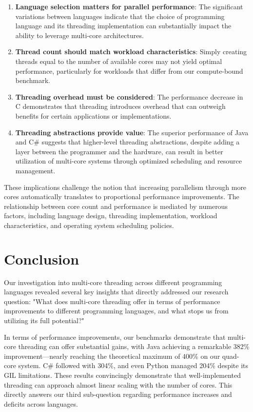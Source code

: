 \documentclass[12pt,a4paper]{article}
\begin{document}
\begin{enumerate}
    \item \textbf{Language selection matters for parallel performance}: The significant variations between languages indicate that the choice of programming language and its threading implementation can substantially impact the ability to leverage multi-core architectures.
    
    \item \textbf{Thread count should match workload characteristics}: Simply creating threads equal to the number of available cores may not yield optimal performance, particularly for workloads that differ from our compute-bound benchmark.
    
    \item \textbf{Threading overhead must be considered}: The performance decrease in C demonstrates that threading introduces overhead that can outweigh benefits for certain applications or implementations.
    
    \item \textbf{Threading abstractions provide value}: The superior performance of Java and C\# suggests that higher-level threading abstractions, despite adding a layer between the programmer and the hardware, can result in better utilization of multi-core systems through optimized scheduling and resource management.
\end{enumerate}

These implications challenge the notion that increasing parallelism through more cores automatically translates to proportional performance improvements. The relationship between core count and performance is mediated by numerous factors, including language design, threading implementation, workload characteristics, and operating system scheduling policies.

\section{Conclusion}

Our investigation into multi-core threading across different programming languages revealed several key insights that directly addressed our research question: "What does multi-core threading offer in terms of performance improvements to different programming languages, and what stops us from utilizing its full potential?"

In terms of performance improvements, our benchmarks demonstrate that multi-core threading can offer substantial gains, with Java achieving a remarkable 382\% improvement—nearly reaching the theoretical maximum of 400\% on our quad-core system. C\# followed with 304\%, and even Python managed 204\% despite its GIL limitations. These results convincingly demonstrate that well-implemented threading can approach almost linear scaling with the number of cores. This directly answers our third sub-question regarding performance increases and deficits across languages.
\end{document}

